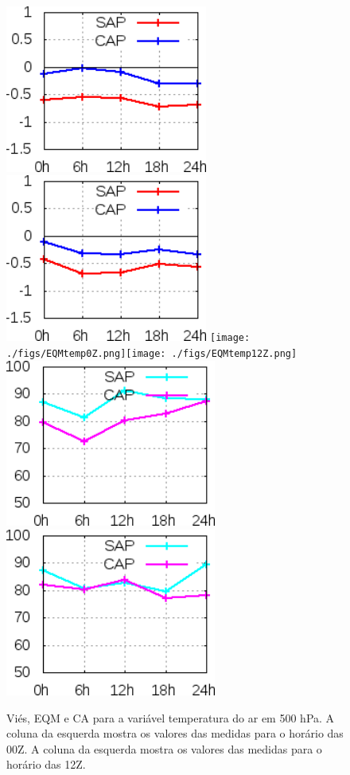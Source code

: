 \begin{figure}[!hbp]
\includegraphics[height=5.5cm]{./figs/VIES500temp0Z.png}\includegraphics[height=5.5cm]{./figs/VIES500temp12Z.png}
\texttt{[image: ./figs/EQMtemp0Z.png]}\texttt{[image: ./figs/EQMtemp12Z.png]}
\includegraphics[height=5.5cm]{./figs/CA500temp0Z.png}\includegraphics[height=5.5cm]{./figs/CA500temp12Z.png}
\caption{Viés, EQM e CA para a variável temperatura do ar em 500 hPa. A coluna da esquerda mostra os valores das medidas para o horário das 00Z. A coluna da esquerda mostra os valores das medidas para o horário das 12Z.}
\label{fig12}
\end{figure}

